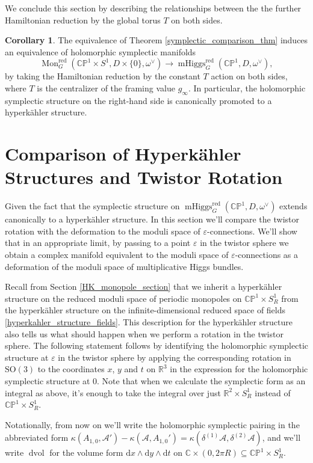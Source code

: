 \documentclass[11pt, oneside, reqno]{amsart}
\theoremstyle{definition} \newtheorem{definition}{Definition}[section]
\newtheorem{corollary}[definition]{Corollary}
\theoremstyle{definition} \newtheorem{remark}[definition]{Remark}
\theoremstyle{definition} \newtheorem{remarks}[definition]{Remarks}
\theoremstyle{definition} \newtheorem{question}[definition]{Question}
\theoremstyle{definition} \newtheorem*{note}{Note}
\theoremstyle{definition} \newtheorem{example}[definition]{Example}
\theoremstyle{definition} \newtheorem{examples}[definition]{Examples}
\newcommand{\bb}[1]{\mathbb{#1}}
\newcommand{\mr}[1]{\mathrm{#1}}
\newcommand{\mc}[1]{\mathcal{#1}}
\newcommand{\CC}{\mathbb{C}}
\newcommand{\RR}{\mathbb{R}}
\newcommand{\eps}{\varepsilon}
\newcommand{\SO}{\mathrm{SO}}
\newcommand{\sub}{\subseteq}
\DeclareMathOperator{\dvol}{dvol}
\DeclareMathOperator{\mhiggs}{mHiggs}
\DeclareMathOperator{\mon}{Mon}
\renewcommand{\d}{\mathrm{d}}
\begin{document}
We conclude this section by describing the relationships between the the further Hamiltonian reduction by the global torus $T$ on both sides.
\begin{corollary}
The equivalence of Theorem \ref{symplectic_comparison_thm} induces an equivalence of holomorphic symplectic manifolds
\[\mon_G^{\mr{red}}(\bb{CP}^1 \times S^1,D \times\{0\},\omega^\vee) \to \mhiggs_G^{\text{red}}(\bb{CP}^1,D,\omega^\vee),\]
by taking the Hamiltonian reduction by the constant $T$ action on both sides, where $T$ is the centralizer of the framing value $g_\infty$.  In particular, the holomorphic symplectic structure on the right-hand side is canonically promoted to a hyperk\"ahler structure.
\end{corollary}

\section{Comparison of Hyperk\"ahler Structures and Twistor Rotation} \label{hyperkahler_section}
Given the fact that the symplectic structure on $\mhiggs_G^{\text{red}}(\bb{CP}^1,D,\omega^\vee)$ extends canonically to a hyperk\"ahler structure.  In this section we'll compare the twistor rotation with the deformation to the moduli space of $\eps$-connections. We'll show that in an appropriate limit, by passing to a point $\eps$ in the twistor sphere we obtain a complex manifold equivalent to the moduli space of $\eps$-connections as a deformation of the moduli space of multiplicative Higgs bundles.

Recall from Section \ref{HK_monopole_section} that we inherit a hyperk\"ahler structure on the reduced moduli space of periodic monopoles on $\bb{CP}^1 \times S^1_R$ from the hyperk\"ahler structure on the infinite-dimensional reduced space of fields \ref{hyperkahler_structure_fields}.  This description for the hyperk\"ahler structure also tells us what should happen when we perform a rotation in the twistor sphere.  The following statement follows by identifying the holomorphic symplectic structure at $\eps$ in the twistor sphere by applying the corresponding rotation in $\SO(3)$ to the coordinates $x$, $y$ and $t$ on $\RR^3$ in the expression for the holomorphic symplectic structure at $0$.  Note that when we calculate the symplectic form as an integral as above, it's enough to take the integral over just $\RR^2 \times S^1_R$ instead of $\bb{CP}^1 \times S^1_R$.

Notationally, from now on we'll write the holomorphic symplectic pairing in the abbreviated form $\kappa(A_{1,0}, \mc A') - \kappa(\mc A, A_{1,0}') = \kappa(\delta^{(1)} \mc A, \delta^{(2)} \mc A)$, and we'll write $\dvol$ for the volume form $\d x \wedge \d y \wedge \d t$ on $\CC \times (0,2\pi R)\sub \bb{CP}^1 \times S^1_R$.
\end{document}
